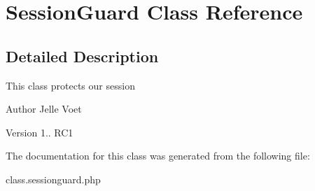 \hypertarget{class_session_guard}{\section{Session\-Guard Class Reference}
\label{class_session_guard}
}


\subsection{Detailed Description}
This class protects our session

\begin{DoxyAuthor}{Author}
Jelle Voet 
\end{DoxyAuthor}
\begin{DoxyVersion}{Version}
1.. R\-C1 
\end{DoxyVersion}


The documentation for this class was generated from the following file\-:\begin{DoxyCompactItemize}
\item 
class.\-sessionguard.\-php\end{DoxyCompactItemize}
